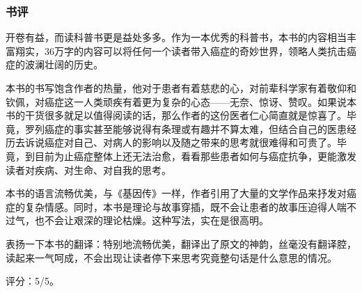 \subsubsection{书评}
开卷有益，而读科普书更是益处多多。作为一本优秀的科普书，本书的内容相当丰富翔实，36万字的内容可以将任何一个读者带入癌症的奇妙世界，领略人类抗击癌症的波澜壮阔的历史。

本书的书写饱含作者的热量，他对于患者有着慈悲的心，对前辈科学家有着敬仰和钦佩，对癌症这一人类顽疾有着更为复杂的心态——无奈、惊讶、赞叹。如果说本书的干货很多就足以值得阅读的话，那么作者的这份医者仁心简直就是惊喜了。毕竟，罗列癌症的事实甚至能够说得有条理或有趣并不算太难，但结合自己的医患经历去诉说癌症对自己、对病人的影响以及随之带来的思考就很难得和可贵了。毕竟，到目前为止癌症整体上还无法治愈，看看那些患者如何与癌症抗争，更能激发读者对疾病、对生命、对自我的思考。

本书的语言流畅优美，与《基因传》一样，作者引用了大量的文学作品来抒发对癌症的复杂情感。同时，本书是理论与故事穿插，既不会让患者的故事压迫得人喘不过气，也不会让艰深的理论枯燥。这种写法，实在是很高明。

表扬一下本书的翻译：特别地流畅优美，翻译出了原文的神韵，丝毫没有翻译腔，读起来一气呵成，不会出现让读者停下来思考究竟整句话是什么意思的情况。

评分：5/5。
